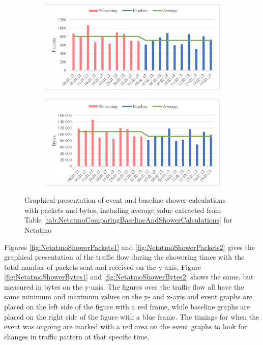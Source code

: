 \begin{figure}[H]
    \centering
    \begin{subfigure}{0.8\textwidth}
       \centering
       \includegraphics[width=1\hsize]{figures/Netatmo_Shower_Calculations_Packets.png} 
    \end{subfigure}
    \begin{subfigure}{0.8\textwidth}
        \centering
        \includegraphics[width=1\hsize]{figures/Netatmo_Shower_Calculations_Bytes.png} 
    \end{subfigure}
    \caption{Graphical presentation of event and baseline shower calculations with packets and bytes, including average value extracted from Table \ref{tab:NetatmoComparingBaselineAndShowerCalculations} for Netatmo}
    \label{fig:NetatmoShowerCalculations}
\end{figure}

Figures \ref{fig:NetatmoShowerPackets1} and \ref{fig:NetatmoShowerPackets2} gives the graphical presentation of the traffic flow during the showering times with the total number of packets sent and received on the y-axis. Figure \ref{fig:NetatmoShowerBytes1} and \ref{fig:NetatmoShowerBytes2} shows the same, but measured in bytes on the y-axis. The figures over the traffic flow all have the same minimum and maximum values on the y- and x-axis and event graphs are placed on the left side of the figure with a red frame, while baseline graphs are placed on the right side of the figure with a blue frame. The timings for when the event was ongoing are marked with a red area on the event graphs to look for changes in traffic pattern at that specific time. 

